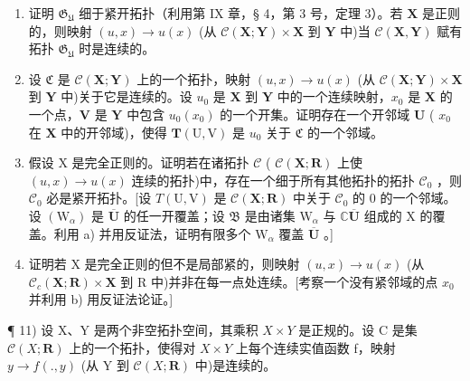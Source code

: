 \begin{enumerate}
\def\labelenumi{\alph{enumi})}
\item
  证明 \(\mathfrak{G}_{\mathfrak{U}}\) 细于紧开拓扑（利用第 IX 章，§ 4，第 3 号，定理 3）。若 \(\mathbf{X}\) 是正则的，则映射 \((u, x) \to u(x)\) (从 \(\mathcal{C}(\mathbf{X}; \mathbf{Y}) \times \mathbf{X}\) 到 \(\mathbf{Y}\) 中)当 \(\mathcal{C}(\mathbf{X}, \mathbf{Y})\) 赋有拓扑 \(\mathfrak{G}_{\mathfrak{U}}\) 时是连续的。
\item
  设 \(\mathfrak{C}\) 是 \(\mathcal{C}(\mathbf{X};\mathbf{Y})\) 上的一个拓扑，映射 \((u,x)\to u(x)\) (从 \(\mathcal{C}(\mathbf{X};\mathbf{Y})\times \mathbf{X}\) 到 \(\mathbf{Y}\) 中)关于它是连续的。设 \(u_0\) 是 \(\mathbf{X}\) 到 \(\mathbf{Y}\) 中的一个连续映射，\(x_0\) 是 \(\mathbf{X}\) 的一个点，\(\mathbf{V}\) 是 \(\mathbf{Y}\) 中包含 \(u_0(x_0)\) 的一个开集。证明存在一个开邻域 \(\mathbf{U}\) ( \(x_0\) 在 \(\mathbf{X}\) 中的开邻域)，使得 \(\pmb{T}(\mathrm{U},\mathrm{V})\) 是 \(u_0\) 关于 \(\mathfrak{C}\) 的一个邻域。
\item
  假设 X 是完全正则的。证明若在诸拓扑 \(\mathcal{C}\) ( \(\mathcal{C}(\mathbf{X};\mathbf{R})\) 上使 \((u,x)\to u(x)\) 连续的拓扑)中，存在一个细于所有其他拓扑的拓扑 \(\mathcal{C}_0\) ，则 \(\mathcal{C}_0\) 必是紧开拓扑。{[}设 \(T(\mathrm{U},\mathrm{V})\) 是 \(\mathcal{C}(\mathbf{X};\mathbf{R})\) 中关于 \(\mathcal{C}_0\) 的 0 的一个邻域。设 \((\mathrm{W}_{\alpha})\) 是 \(\overline{\mathbf{U}}\) 的任一开覆盖；设 \(\mathfrak{B}\) 是由诸集 \(\mathrm{W}_{\alpha}\) 与 \(\mathbb{C}\overline{\mathbf{U}}\) 组成的 X 的覆盖。利用 a) 并用反证法，证明有限多个 \(\mathrm{W}_{\alpha}\) 覆盖 \(\overline{\mathbf{U}}\) 。{]}
\item
  证明若 X 是完全正则的但不是局部紧的，则映射 \((u, x) \to u(x)\) (从 \(\mathcal{C}_{c}(\mathbf{X}; \mathbf{R}) \times \mathbf{X}\) 到 R 中)并非在每一点处连续。{[}考察一个没有紧邻域的点 \(x_{0}\) 并利用 b) 用反证法论证。{]}
\end{enumerate}

¶ 11) 设 X、Y 是两个非空拓扑空间，其乘积 \(X \times Y\) 是正规的。设 C 是集 \(\mathcal{C}(X; \mathbf{R})\) 上的一个拓扑，使得对 \(X \times Y\) 上每个连续实值函数 f，映射 \(y \to f(., y)\) (从 Y 到 \(\mathcal{C}(X; \mathbf{R})\) 中)是连续的。

